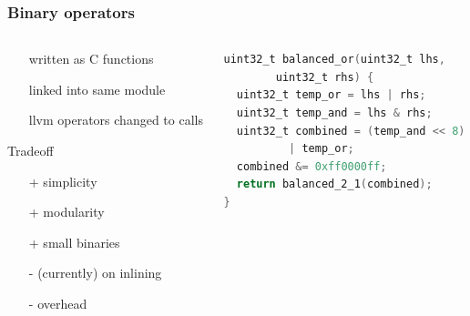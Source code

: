 \documentclass[11pt,t,usepdftitle=false,aspectratio=169]{beamer}
\begin{document}
\begin{frame}[fragile]
  \frametitle{Binary operators}
  \begin{columns}[T]
    \begin{column}{.48\textwidth}
      \begin{itemize}
      \item[] written as C functions
      \item[] linked into same module
      \item[] llvm operators changed to calls
      \end{itemize}
      \vfill
      \begin{block}{Tradeoff}
        \begin{itemize}
        \item[+] simplicity
        \item[+] modularity
        \item[+] small binaries
        \item[-] (currently) on inlining
        \item[-] overhead
        \end{itemize}
      \end{block}
    \end{column}
    \hfill
    \pause
    \begin{column}{.48\textwidth}
      \vspace{0.7cm}
      \begin{lstlisting}[language=C, basicstyle=\small]
uint32_t balanced_or(uint32_t lhs,
        uint32_t rhs) {
  uint32_t temp_or = lhs | rhs;
  uint32_t temp_and = lhs & rhs;
  uint32_t combined = (temp_and << 8)
          | temp_or;
  combined &= 0xff0000ff;
  return balanced_2_1(combined);
}
      \end{lstlisting}
    \end{column}
  \end{columns}
\end{frame}
\end{document}
